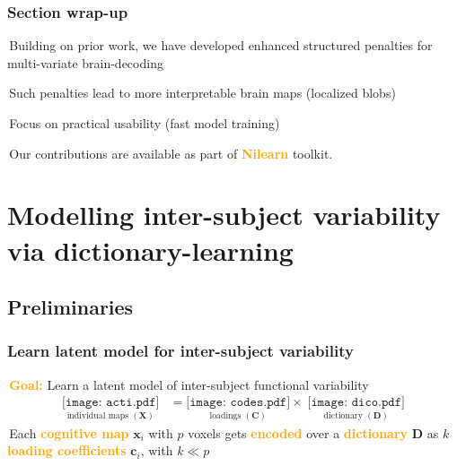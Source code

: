 \documentclass{beamer}
\def\mydot{\structure{\rule{1ex}{1ex}}\,}
\def\B#1{\mathbf{#1}}
\def\emph#1{\textbf{\textcolor{orange}{#1}}}
\begin{document}




\begin{frame}\frametitle{Section wrap-up}
  \mydot Building on prior work, we have developed enhanced structured penalties for multi-variate brain-decoding

  \bigskip
  
  \mydot Such penalties lead to more interpretable brain maps (localized blobs)

  \bigskip
  
  \mydot Focus on practical usability (fast model training)

  \bigskip
  
  \mydot Our contributions are available as part of \emph{Nilearn} toolkit.
  
\end{frame}

\section{Modelling inter-subject variability via dictionary-learning}
\subsection{Preliminaries}
\begin{frame}
  \frametitle{Learn latent model for inter-subject variability}
  \mydot \emph{Goal:} Learn a latent model of inter-subject functional variability
    \begin{equation*}
      \begin{split}
        \underset{\text{individual maps }(\B{X})}{\texttt{[image: acti.pdf]}} &=  \underset{\text{loadings }(\B{C})}{\texttt{[image: codes.pdf]}} \times \;\underset{\text{dictionary }(\B{D})}{\texttt{[image: dico.pdf]}}
      \end{split}
    \end{equation*}
    \mydot Each \emph{cognitive map} $\B{x}_i$ with $p$ voxels gets \emph{encoded} over a \emph{dictionary} $\B{D}$ as $k$ \emph{loading coefficients} $\B{c}_i$,
    with $k \ll p$
\end{frame}  
\end{document}
